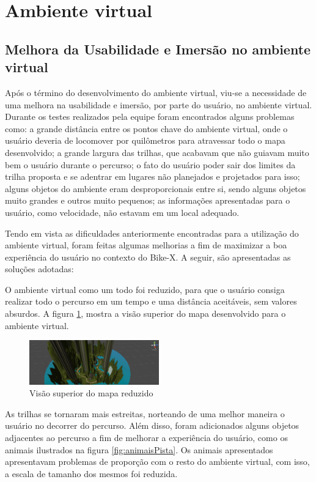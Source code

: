 \section {Ambiente virtual}

\subsection{ Melhora da Usabilidade e Imersão no ambiente virtual }

Após o término do desenvolvimento do ambiente virtual, viu-se a necessidade de uma melhora na usabilidade e imersão, por parte do usuário, no ambiente virtual. Durante os testes realizados pela equipe foram encontrados alguns problemas como: a grande distância entre os pontos chave do ambiente virtual, onde o usuário deveria de locomover por quilômetros para atravessar todo o mapa desenvolvido; a grande largura das trilhas, que acabavam que não guiavam muito bem o usuário durante o percurso; o fato do usuário poder sair dos limites da trilha proposta e se adentrar em lugares não planejados e projetados para isso; alguns objetos do ambiente eram desproporcionais entre si, sendo alguns objetos muito grandes e outros muito pequenos; as informações apresentadas para o usuário, como velocidade, não estavam em um local adequado.

Tendo em vista as dificuldades anteriormente encontradas para a utilização do ambiente virtual, foram feitas algumas melhorias a fim de maximizar a boa experiência do usuário no contexto do Bike-X. A seguir, são apresentadas as soluções adotadas:

O ambiente virtual como um todo foi reduzido, para que o usuário consiga realizar todo o percurso em um tempo e uma distância aceitáveis, sem valores absurdos. A figura \ref{fig:mapaReduzido}, mostra a visão superior do mapa desenvolvido para o ambiente virtual.

\begin{figure}[h]
  \centering
  \includegraphics[width=0.5\textwidth]{figuras/mapaReduzido}
  \caption{Visão superior do mapa reduzido}
  \label{fig:mapaReduzido}
\end{figure}

As trilhas se tornaram mais estreitas, norteando de uma melhor maneira o usuário no decorrer do percurso. Além disso, foram adicionados alguns objetos adjacentes ao percurso a fim de melhorar a experiência do usuário, como os animais ilustrados na figura \ref{fig:animaisPista}. Os animais apresentados apresentavam problemas de proporção com o resto do ambiente virtual, com isso, a escala de tamanho dos mesmos foi reduzida.

